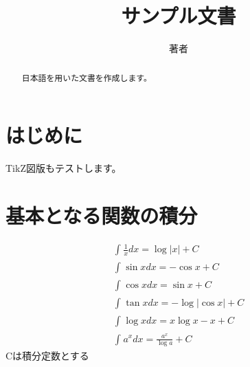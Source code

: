 \documentclass[dvipdfmx,autodetect-engine]{jsarticle}
\title{サンプル文書}
\author{著者}
\begin{document}
\maketitle

\begin{abstract}
日本語を用いた文書を作成します。    
\end{abstract}

\section{はじめに}

TikZ図版もテストします。

\begin{center}
\end{center}

\section{基本となる関数の積分}

\begin{eqnarray}
\int_{}^{}
\frac{1}{x}
dx=\log |x|+C
\\
\int_{}^{}
\sin xdx=-\cos x+C
\\
\int_{}^{}
\cos xdx=\sin x+C
\\
\int_{}^{}
\tan xdx=-\log |\cos x|+C
\\
\int_{}^{}
\log xdx=x\log x-x+C
\\
\int_{}^{}
a^xdx=
\frac{a^x}{\log a}
+C
\end{eqnarray}
Cは積分定数とする
\end{document}
